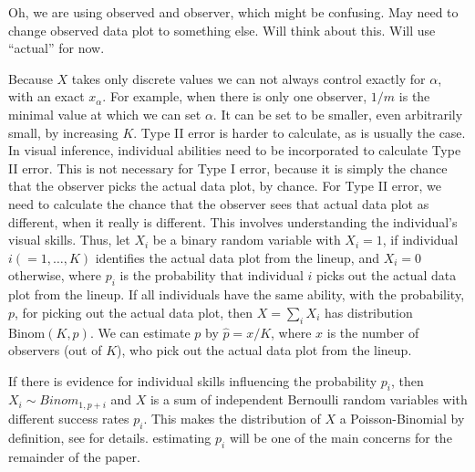 \documentclass{article}
\newcommand{\green}[1]{{\color{green} #1}} %
\newcommand{\hh}[1]{{\color{orange} #1}} %
\begin{document}
\green{Oh, we are using observed and observer, which might be confusing. May need to change observed data plot to something else. Will think about this. Will use ``actual'' for now.}

\noindent Because $X$ takes only discrete values we can not always control exactly for $\alpha$, with an exact $x_{\alpha}$. For example, when there is only one observer, $1/m$ is the minimal value at which we can set $\alpha$. It can be set to be smaller, even arbitrarily small, by increasing $K$. Type II error is harder to calculate, as is usually the case. In visual inference, individual abilities need to be incorporated to calculate Type II error. This is not necessary for Type I error, because it is simply the chance that the observer picks the actual data plot, by chance. For Type II error, we need to calculate the chance that the observer sees that actual data plot as different, when it really is different. This involves understanding the individual's visual skills. Thus, let $X_i$ be a binary random variable with $X_i = 1$, if individual $i (=1, \dots , K)$ identifies the actual data plot from the lineup, and $X_i = 0$ otherwise, where $p_i$ is the probability that individual $i$ picks out the actual data plot from the lineup. If all individuals have the same ability, with the probability, $p$, for picking out the actual data plot, then $X = \sum_i X_i$ has distribution $\text{Binom}(K, p)$. We can estimate $p$ by $\hat{p} = x/K$, where $x$ is the number of observers (out of $K$), who pick out the actual data plot from the lineup. 

\hh{If there is evidence for individual skills influencing the probability $p_i$, then $X_i \sim Binom_{1, p+i}$ and $X$ is a sum of independent Bernoulli random variables with different success rates $p_i$. This makes the distribution of $X$ a Poisson-Binomial by definition, see \citet{butler93} for details. estimating $p_i$ will be one of the main concerns for the remainder of the paper.}






\end{document}

